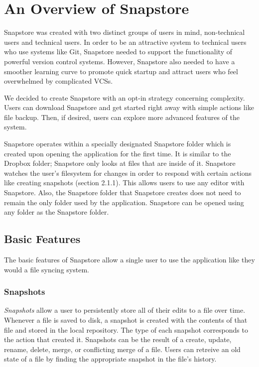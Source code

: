 \chapter{An Overview of Snapstore}

Snapstore was created with two distinct groups of users in mind, non-technical users and technical users. In order to be an attractive system to technical users who use systems like Git, Snapstore needed to support the functionality of powerful version control systems. However, Snapstore also needed to have a smoother learning curve to promote quick startup and attract users who feel overwhelmed by complicated VCSs. 

We decided to create Snapstore with an opt-in strategy concerning complexity. Users can download Snapstore and get started right away with simple actions like file backup. Then, if desired, users can explore more advanced features of the system.


Snapstore operates within a specially designated Snapstore folder which is created upon opening the application for the first time. It is similar to the Dropbox folder; Snapstore only looks at files that are inside of it. Snapstore watches the user's filesystem for changes in order to respond with certain actions like creating snapshots (section 2.1.1). This allows users to use any editor with Snapstore. Also, the Snapstore folder that Snapstore creates does not need to remain the only folder used by the application. Snapstore can be opened using any folder as the Snapstore folder.

\section{Basic Features}

The basic features of Snapstore allow a single user to use the application like they would a file syncing system.

\subsection{Snapshots}

\textit{Snapshots} allow a user to persistently store all of their edits to a file over time. Whenever a file is saved to disk, a snapshot is created with the contents of that file and stored in the local repository. The type of each snapshot corresponds to the action that created it. Snapshots can be the result of a create, update, rename, delete, merge, or conflicting merge of a file. Users can retreive an old state of a file by finding the appropriate snapshot in the file's history.

